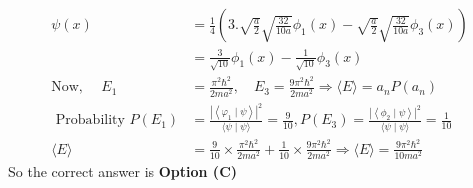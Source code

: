 \begin{enumerate}
\begin{answer}
\begin{align*}
\psi(x)&=\frac{1}{4}\left(3 . \sqrt{\frac{a}{2}} \sqrt{\frac{32}{10 a}} \phi_{1}(x)-\sqrt{\frac{a}{2}} \sqrt{\frac{32}{10 a}} \phi_{3}(x)\right)\\&=\frac{3}{\sqrt{10}} \phi_{1}(x)-\frac{1}{\sqrt{10}} \phi_{3}(x)\\
\text{Now, }\quad E_{1}&=\frac{\pi^{2} \hbar^{2}}{2 m a^{2}}, \quad E_{3}=\frac{9 \pi^{2} \hbar^{2}}{2 m a^{2}} \Rightarrow\langle E\rangle=a_{n} P\left(a_{n}\right)\\
\text{	Probability }P\left(E_{1}\right)&=\frac{\left|\left\langle\varphi_{1} \mid \psi\right\rangle\right|^{2}}{\langle\psi \mid \psi\rangle}=\frac{9}{10}, P\left(E_{3}\right)=\frac{\left|\left\langle\phi_{2} \mid \psi\right\rangle\right|^{2}}{\langle\psi \mid \psi\rangle}=\frac{1}{10}\\
\langle E\rangle&=\frac{9}{10} \times \frac{\pi^{2} \hbar^{2}}{2 m a^{2}}+\frac{1}{10} \times \frac{9 \pi^{2} \hbar^{2}}{2 m a^{2}} \Rightarrow\langle E\rangle=\frac{9 \pi^{2} \hbar^{2}}{10 m a^{2}}
\end{align*}
So the correct answer is \textbf{Option (C)}
\end{answer}	
\end{enumerate}